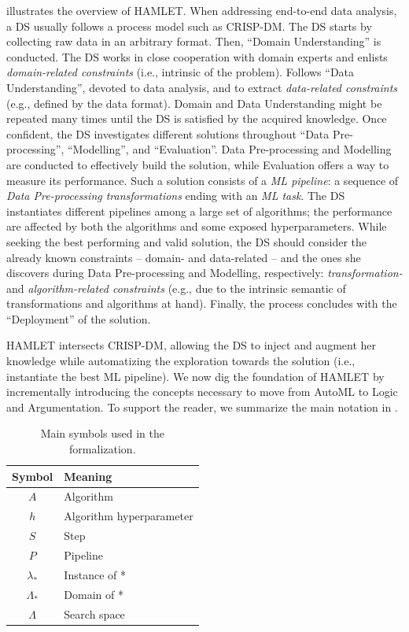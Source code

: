  illustrates the overview of HAMLET.
When addressing end-to-end data analysis, a DS usually follows a process model such as CRISP-DM.
The DS starts by collecting raw data in an arbitrary format.
Then, ``Domain Understanding'' is conducted.
The DS works in close cooperation with domain experts and enlists \emph{domain-related constraints} (i.e., intrinsic of the problem).
Follows ``Data Understanding'', devoted to data analysis, and to extract \emph{data-related constraints} (e.g., defined by the data format).
Domain and Data Understanding might be repeated many times until the DS is satisfied by the acquired knowledge.
Once confident, the DS investigates different solutions throughout ``Data Pre-processing'', ``Modelling'', and ``Evaluation''.
Data Pre-processing and Modelling are conducted to effectively build the solution, while Evaluation offers a way to measure its performance.
Such a solution consists of a \emph{ML pipeline}: a sequence of \emph{Data Pre-processing transformations} ending with an \emph{ML task}.
The DS instantiates different pipelines among a large set of algorithms; the performance are affected by both the algorithms and some exposed hyperparameters.
While seeking the best performing and valid solution, the DS should consider the already known constraints -- domain- and data-related -- and the ones she discovers during Data Pre-processing and Modelling, respectively: \emph{transformation-} and \emph{algorithm-related constraints} (e.g., due to the intrinsic semantic of transformations and algorithms at hand).
Finally, the process concludes with the ``Deployment'' of the solution.

HAMLET intersects CRISP-DM, allowing the DS to inject and augment her knowledge while automatizing the exploration towards the solution (i.e., instantiate the best ML pipeline). 
We now dig the foundation of HAMLET by incrementally introducing the concepts necessary to move from AutoML to Logic and Argumentation.
To support the reader, we summarize the main notation in .

\begin{table}[t]
    \centering
    \footnotesize
    \caption{Main symbols used in the formalization.}
    \begin{tabular}{cl}
        \toprule
        \textbf{Symbol} & \textbf{Meaning} \\
        \midrule
        $A$ & Algorithm \\
        $h$ & Algorithm hyperparameter \\
        $S$ & Step \\
        $P$ & Pipeline \\
        $\lambda_*$ & Instance of * \\
        $\Lambda_*$ & Domain of * \\
        $\Lambda$ & Search space \\
        \bottomrule
    \end{tabular}
    \label{tab:symbols}
\end{table}

